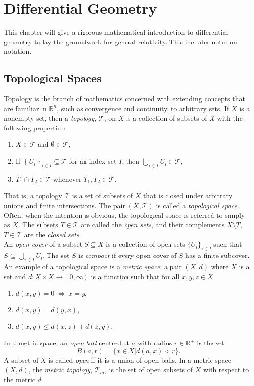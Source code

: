 %
%

\chapter{Differential Geometry}
This chapter will give a rigorous mathematical introduction to differential geometry to lay the groundwork for general relativity. This includes notes on notation.

\section{Topological Spaces}
Topology is the branch of mathematics concerned with extending concepts that are familiar in $\mathbb{R}^n$, such as convergence and continuity, to arbitrary sets. If $X$ is a nonempty set, then a \textit{topology}, $\mathscr{T}$, on $X$ is a collection of subsets of $X$ with the following properties:
\begin{enumerate}
	\item $X \in \mathscr{T}$ and $\emptyset \in \mathscr{T}$,
	\item If $\left\{U_i\right\}_{i \in I} \subseteq \mathscr{T}$ for an
index set $I$, then $\bigcup_{i \in I} U_i \in 		            
\mathscr{T}$,
	\item $T_1 \cap T_2 \in \mathscr{T}$ whenever $T_1, T_2 \in
\mathscr{T}$.
\end{enumerate}

That is, a topology $\mathscr{T}$ is a set of subsets of $X$ that is closed under arbitrary unions and finite intersections. The pair $(X,\mathscr{T})$ is called a \textit{topological space}. Often, when the intention is obvious, the topological space is referred to simply as $X$. The subsets $T \in \mathscr{T}$ are called the \textit{open sets}, and their complements $X \setminus T$, $T \in \mathscr{T}$ are the \textit{closed sets}. \\

An \textit{open cover} of a subset $S\subseteq X$ is a collection of open sets $\{U_i\}_{i\in I}$ such that $S\subseteq\bigcup_{i\in I}U_i$. The set $S$ is \textit{compact} if every open cover of $S$ has a finite subcover.\\

An example of a topological space is a \textit{metric space}; a pair $(X,d)$ where $X$ is a set and $d:X \times X \rightarrow \left[ 0, \infty \right)$ is a function such that for all $x,y,z \in X$
\begin{enumerate}
	\item $d(x,y)=0 \: \Leftrightarrow \: x=y$,
	\item $d(x,y)=d(y,x)$,
	\item $d(x,y)\leq	d(x,z) + d(z,y)$.
\end{enumerate}
In a metric space, an \textit{open ball} centred at $a$ with radius $r\in \mathbb{R}^+$ is the set  $$B(a,r)=\{ x\in X | d(a,x)<r \}.$$ A subset of $X$ is called \textit{open} if it is a union of open balls. In a metric space $(X,d)$, the \textit{metric topology}, $\mathscr{T}_m$, is the set of open subsets of $X$ with respect to the metric $d$.\\

